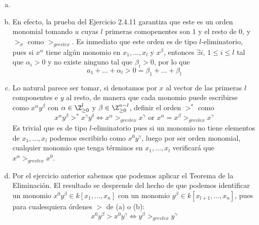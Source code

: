\documentclass[twoside]{article}
\begin{document}
\begin{solucion}
\begin{enumerate}[a.]
\item[]
\item En efecto, la prueba del Ejercicio 2.4.11 garantiza que este es un orden monomial tomando $u$ cuyas $l$ primeras comopenentes son $1$ y el resto de $0$, y $>_\sigma$ como $>_{grevlex}$. Es inmediato que este orden es de tipo $l$-eliminatorio, pues si $x^\alpha$ tiene algún monomio en $x_1,\dotsc,x_l$ y $x^\beta$, entonces $\exists i$, $1\leq i \leq l$ tal que $\alpha_i >0$ y no existe ninguno tal que $\beta_i >0$, por lo que 
$$
a_1 + \dotsc + \alpha_l > 0 = \beta_1 + \dotsc + \beta_l
$$
\item Lo natural parece ser tomar, si denotamos por $x$ al vector de las primeras $l$ componentes e $y$ al resto, de manera que cada monomio puede escribirse como $x^\alpha y^\beta$ con $\alpha\in \Z^l_{\geq0}$ y $\beta \in \Z_{\geq 0}^{n-l}$, definir el orden $>^*$ como
$$
x^\alpha y^\beta >^* x^\gamma y^\delta \Leftrightarrow x^\alpha >_{grevlex} x^\gamma \text{ or } x^\alpha = x^\beta >_{grevlex} x^\gamma
$$
Es trivial que es de tipo $l$-eliminatorio pues si un monomio no tiene elementos de $x_1,\dotsc,x_l$ podemos escribirlo como $x^0y^\gamma$, luego por ser orden monomial, cualquier monomio que tenga términos en $x_1,\dotsc,x_l$ verificará que $x^\alpha >_{grevlex}x^0$.
\item Por el ejercicio anterior sabemos que podemos aplicar el Teorema de la Eliminación. El resultado se desprende del hecho de que podemos identificar un monomio $x^0 y^\beta \in k[x_1,\dotsc,x_n]$ con un monomio $y^\beta \in k[x_{l+1},\dotsc,x_n]$, pues para cualesquiera órdenes $>$ de (a) o (b):
$$
x^0y^\beta > x^0y^\gamma \Leftrightarrow y^\beta >_{grevlex} y^\gamma
$$
\end{enumerate}
\end{solucion}


\newpage
\end{document}
